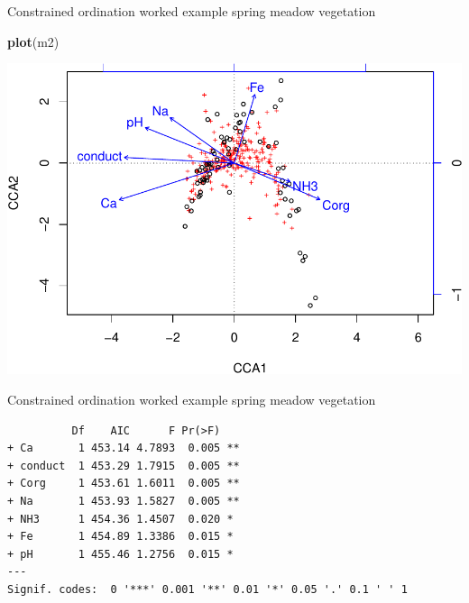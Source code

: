\documentclass[10pt,ignorenonframetext,compress, aspectratio=169]{beamer}
\newenvironment{Shaded}{\begin{snugshade}}{\end{snugshade}}
\newcommand{\KeywordTok}[1]{\textcolor[rgb]{0.13,0.29,0.53}{\textbf{{#1}}}}
\newcommand{\NormalTok}[1]{{#1}}
\begin{document}
\begin{frame}[fragile]{Constrained ordination worked example \textbar{}
spring meadow vegetation}

\scriptsize

\begin{Shaded}
\begin{Highlighting}[]
\KeywordTok{plot}\NormalTok{(m2)}
\end{Highlighting}
\end{Shaded}

\begin{center}\includegraphics[width=0.5\linewidth]{vegan-constrained-slides_files/figure-beamer/meadows-cca-reduced-triplot-1} \end{center}

\normalsize

\end{frame}

\begin{frame}[fragile]{Constrained ordination worked example \textbar{}
spring meadow vegetation}

\scriptsize

\begin{Shaded}
\end{Shaded}

\begin{verbatim}
          Df    AIC      F Pr(>F)   
+ Ca       1 453.14 4.7893  0.005 **
+ conduct  1 453.29 1.7915  0.005 **
+ Corg     1 453.61 1.6011  0.005 **
+ Na       1 453.93 1.5827  0.005 **
+ NH3      1 454.36 1.4507  0.020 * 
+ Fe       1 454.89 1.3386  0.015 * 
+ pH       1 455.46 1.2756  0.015 * 
---
Signif. codes:  0 '***' 0.001 '**' 0.01 '*' 0.05 '.' 0.1 ' ' 1
\end{verbatim}

\normalsize

\end{frame}
\end{document}
